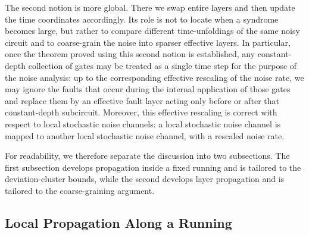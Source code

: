 The second notion is more global. There we swap entire layers and then update the time coordinates accordingly. Its role is not to locate when a syndrome becomes large, but rather to compare different time-unfoldings of the same noisy circuit and to coarse-grain the noise into sparser effective layers. In particular, once the theorem proved using this second notion is established, any constant-depth collection of gates may be treated as a single time step for the purpose of the noise analysis: up to the corresponding effective rescaling of the noise rate, we may ignore the faults that occur during the internal application of those gates and replace them by an effective fault layer acting only before or after that constant-depth subcircuit. Moreover, this effective rescaling is correct with respect to local stochastic noise channels: a local stochastic noise channel is mapped to another local stochastic noise channel, with a rescaled noise rate.

For readability, we therefore separate the discussion into two subsections. The first subsection develops propagation inside a fixed running and is tailored to the deviation-cluster bounds, while the second develops layer propagation and is tailored to the coarse-graining argument.

\subsection{Local Propagation Along a Running}

